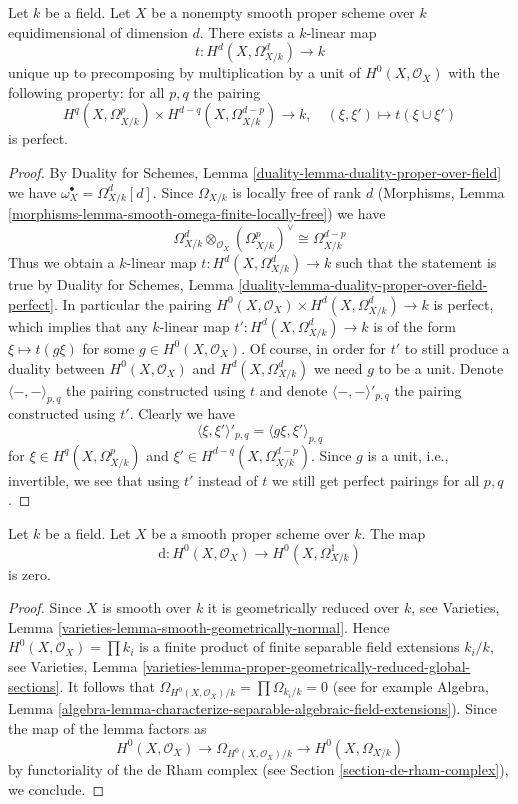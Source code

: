 \begin{lemma}
\label{lemma-duality-hodge}
Let $k$ be a field. Let $X$ be a nonempty smooth proper scheme over $k$
equidimensional of dimension $d$. There exists a $k$-linear map
$$
t : H^d(X, \Omega^d_{X/k}) \longrightarrow k
$$
unique up to precomposing by multiplication by a unit of
$H^0(X, \mathcal{O}_X)$ with the following property: for all $p, q$ the pairing
$$
H^q(X, \Omega^p_{X/k}) \times H^{d - q}(X, \Omega^{d - p}_{X/k})
\longrightarrow
k, \quad
(\xi, \xi') \longmapsto t(\xi \cup \xi')
$$
is perfect.
\end{lemma}

\begin{proof}
By Duality for Schemes, Lemma \ref{duality-lemma-duality-proper-over-field}
we have $\omega_X^\bullet = \Omega^d_{X/k}[d]$.
Since $\Omega_{X/k}$ is locally free of rank $d$
(Morphisms, Lemma \ref{morphisms-lemma-smooth-omega-finite-locally-free})
we have
$$
\Omega^d_{X/k} \otimes_{\mathcal{O}_X} (\Omega^p_{X/k})^\vee
\cong
\Omega^{d - p}_{X/k}
$$
Thus we obtain a $k$-linear map $t : H^d(X, \Omega^d_{X/k}) \to k$
such that the statement is true by Duality for Schemes, Lemma
\ref{duality-lemma-duality-proper-over-field-perfect}.
In particular the pairing
$H^0(X, \mathcal{O}_X) \times H^d(X, \Omega^d_{X/k}) \to k$
is perfect, which implies that any $k$-linear map
$t' : H^d(X, \Omega^d_{X/k}) \to k$ is of the form
$\xi \mapsto t(g\xi)$ for some $g \in H^0(X, \mathcal{O}_X)$.
Of course, in order for $t'$ to still produce a duality
between $H^0(X, \mathcal{O}_X)$ and $H^d(X, \Omega^d_{X/k})$
we need $g$ to be a unit. Denote $\langle -, - \rangle_{p, q}$
the pairing constructed using $t$ and denote $\langle -, - \rangle'_{p, q}$
the pairing constructed using $t'$. Clearly we have
$$
\langle \xi, \xi' \rangle'_{p, q} =
\langle g\xi, \xi' \rangle_{p, q}
$$
for $\xi \in H^q(X, \Omega^p_{X/k})$ and
$\xi' \in H^{d - q}(X, \Omega^{d - p}_{X/k})$. Since $g$ is a unit, i.e.,
invertible, we see that using $t'$ instead of $t$ we still get perfect
pairings for all $p, q$.
\end{proof}

\begin{lemma}
\label{lemma-bottom-part-degenerates}
Let $k$ be a field. Let $X$ be a smooth proper scheme over $k$. The map
$$
\text{d} : H^0(X, \mathcal{O}_X) \to H^0(X, \Omega^1_{X/k})
$$
is zero.
\end{lemma}

\begin{proof}
Since $X$ is smooth over $k$ it is geometrically reduced over $k$, see
Varieties, Lemma \ref{varieties-lemma-smooth-geometrically-normal}.
Hence $H^0(X, \mathcal{O}_X) = \prod k_i$
is a finite product of finite separable
field extensions $k_i/k$, see Varieties, Lemma
\ref{varieties-lemma-proper-geometrically-reduced-global-sections}.
It follows that $\Omega_{H^0(X, \mathcal{O}_X)/k} = \prod \Omega_{k_i/k} = 0$
(see for example Algebra, Lemma
\ref{algebra-lemma-characterize-separable-algebraic-field-extensions}).
Since the map of the lemma factors as
$$
H^0(X, \mathcal{O}_X) \to
\Omega_{H^0(X, \mathcal{O}_X)/k} \to
H^0(X, \Omega_{X/k})
$$
by functoriality of the de Rham complex
(see Section \ref{section-de-rham-complex}), we conclude.
\end{proof}

